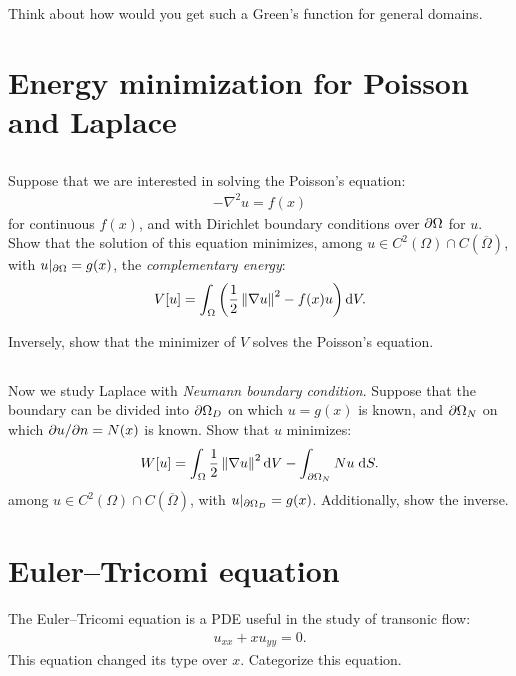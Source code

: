 \documentclass[11pt,letterpaper]{article}
\begin{document}
Think about how would you get such a Green's function for general domains. 

\section{Energy minimization for Poisson and Laplace}
\subsection{} Suppose that we are interested in solving the Poisson's equation:
\begin{align}
    -\nabla^2 u = f(x)
\end{align}
for continuous $f(x)$, and with Dirichlet boundary conditions over $\partial\Omega$ for $u$. Show that the solution of this equation minimizes, among $u\in C^2(\Omega)\cap C(\overline{\Omega})$, with $u|_{\partial\Omega} = g(x)$, the \emph{complementary energy}:
\begin{align}
    V[u] = \int_\Omega \left(\frac{1}{2}\left\Vert \nabla u \right\Vert^2-f(x)u\right)\mathrm{d} V. 
\end{align}

Inversely, show that the minimizer of $V$ solves the Poisson's equation.

\subsection{}
Now we study Laplace with \emph{Neumann boundary condition}. Suppose that the boundary can be divided into $\partial\Omega_D$ on which $u = g(x)$ is known, and $\partial\Omega_N$ on
which $\partial u/\partial n = N(x)$ is known. Show that $u$ minimizes:
\begin{align}
    W[u] = \int_\Omega \frac{1}{2}\left\Vert \nabla u \right\Vert^2\mathrm{d} V-\int_{\partial\Omega_N} Nu\;\mathrm{d} S. 
\end{align}
among $u\in C^2(\Omega)\cap C(\overline{\Omega})$, with $u|_{\partial\Omega_D} = g(x)$. Additionally, show the inverse.

\section{Euler–Tricomi equation}
The Euler–Tricomi equation is a PDE useful in the study of transonic flow:
\begin{align}
    u_{xx}+xu_{yy} = 0.
\end{align}
This equation changed its type over $x$. Categorize this equation.



\vfill
\printbibliography
\end{document}
